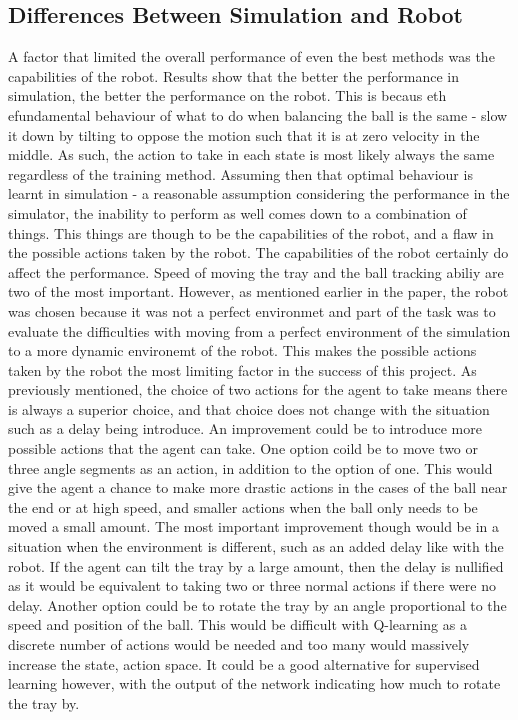 \documentclass[12pt,a4paper]{article}
\begin{document}
\subsection{Differences Between Simulation and Robot}
A factor that limited the overall performance of even the best methods was the capabilities of the robot. Results show that the better the performance in simulation, the better the performance on the robot. This is becaus eth efundamental behaviour of what to do when balancing the ball is the same - slow it down by tilting to oppose the motion such that it is at zero velocity in the middle. As such, the action to take in each state is most likely always the same regardless of the training method. Assuming then that optimal behaviour is learnt in simulation - a reasonable assumption considering the performance in the simulator, the inability to perform as well comes down to a combination of things. This things are though to be the capabilities of the robot, and a flaw in the possible actions taken by the robot. The capabilities of the robot certainly do affect the performance. Speed of moving the tray and the ball tracking abiliy are two of the most important. However, as mentioned earlier in the paper, the robot was chosen because it was not a perfect environmet and part of the task was to evaluate the difficulties with moving from a perfect environment of the simulation to a more dynamic environemt of the robot. This makes the possible actions taken by the robot the most limiting factor in the success of this project. As previously mentioned, the choice of two actions for the agent to take means there is always a superior choice, and that choice does not change with the situation such as a delay being introduce. An improvement could be to introduce more possible actions that the agent can take. One option coild be to move two or three angle segments as an action, in addition to the option of one. This would give the agent a chance to make more drastic actions in the cases of the ball near the end or at high speed, and smaller actions when the ball only needs to be moved a small amount. The most important improvement though would be in a situation when the environment is different, such as an added delay like with the robot. If the agent can tilt the tray by a large amount, then the delay is nullified as it would be equivalent to taking two or three normal actions if there were no delay. Another option could be to rotate the tray by an angle proportional to the speed and position of the ball. This would be difficult with Q-learning as a discrete number of actions would be needed and too many would massively increase the state, action space. It could be a good alternative for supervised learning however, with the output of the network indicating how much to rotate the tray by. 
\end{document}
